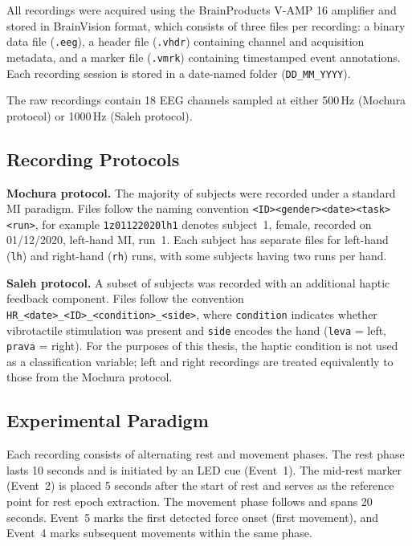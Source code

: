 \documentclass[english, bc, kiv, he, iso690alph, pdf]{fasthesis}
\begin{document}
All recordings were acquired using the BrainProducts V-AMP 16 amplifier and stored in BrainVision format, which consists of three files per recording: a binary data file (\texttt{.eeg}), a header file (\texttt{.vhdr}) containing channel and acquisition metadata, and a marker file (\texttt{.vmrk}) containing timestamped event annotations. Each recording session is stored in a date-named folder (\texttt{DD\_MM\_YYYY}).

The raw recordings contain 18 EEG channels sampled at either 500\,Hz (Mochura protocol) or 1000\,Hz (Saleh protocol).

\subsection{Recording Protocols}

\textbf{Mochura protocol.} The majority of subjects were recorded under a standard MI paradigm. Files follow the naming convention \texttt{<ID><gender><date><task><run>}, for example \texttt{1z01122020lh1} denotes subject~1, female, recorded on 01/12/2020, left-hand MI, run~1. Each subject has separate files for left-hand (\texttt{lh}) and right-hand (\texttt{rh}) runs, with some subjects having two runs per hand.

\textbf{Saleh protocol.} A subset of subjects was recorded with an additional haptic feedback component. Files follow the convention \texttt{HR\_<date>\_\allowbreak<ID>\_\allowbreak<condition>\_\allowbreak<side>}, where \texttt{condition} indicates whether vibrotactile stimulation was present and \texttt{side} encodes the hand (\texttt{leva} = left, \texttt{prava} = right). For the purposes of this thesis, the haptic condition is not used as a classification variable; left and right recordings are treated equivalently to those from the Mochura protocol.

\subsection{Experimental Paradigm}

Each recording consists of alternating rest and movement phases. The rest phase lasts 10 seconds and is initiated by an LED cue (Event~1). The mid-rest marker (Event~2) is placed 5 seconds after the start of rest and serves as the reference point for rest epoch extraction. The movement phase follows and spans 20 seconds. Event~5 marks the first detected force onset (first movement), and Event~4 marks subsequent movements within the same phase.
\end{document}

